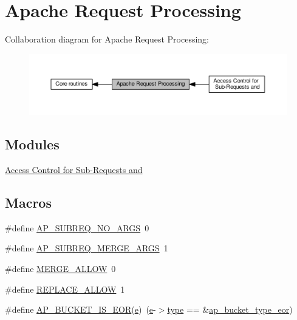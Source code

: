 \hypertarget{group__APACHE__CORE__REQ}{}\section{Apache Request Processing}
\label{group__APACHE__CORE__REQ}
Collaboration diagram for Apache Request Processing\+:
\nopagebreak
\begin{figure}[H]
\begin{center}
\leavevmode
\includegraphics[width=350pt]{group__APACHE__CORE__REQ}
\end{center}
\end{figure}
\subsection*{Modules}
\begin{DoxyCompactItemize}
\item 
\hyperlink{group__APACHE__CORE__REQ__AUTH}{Access Control for Sub-\/\+Requests and}
\end{DoxyCompactItemize}
\subsection*{Macros}
\begin{DoxyCompactItemize}
\item 
\#define \hyperlink{group__APACHE__CORE__REQ_gafc8d6d3833a22ffba0e9e336b99483eb}{A\+P\+\_\+\+S\+U\+B\+R\+E\+Q\+\_\+\+N\+O\+\_\+\+A\+R\+GS}~0
\item 
\#define \hyperlink{group__APACHE__CORE__REQ_ga3ddad04727c3c248d42a84cd5b765d16}{A\+P\+\_\+\+S\+U\+B\+R\+E\+Q\+\_\+\+M\+E\+R\+G\+E\+\_\+\+A\+R\+GS}~1
\item 
\#define \hyperlink{group__APACHE__CORE__REQ_gaa5d5871a4266e0548907af754b538aaf}{M\+E\+R\+G\+E\+\_\+\+A\+L\+L\+OW}~0
\item 
\#define \hyperlink{group__APACHE__CORE__REQ_ga9931376dd0f4fa2ebce0ece6bbe91aa5}{R\+E\+P\+L\+A\+C\+E\+\_\+\+A\+L\+L\+OW}~1
\item 
\#define \hyperlink{group__APACHE__CORE__REQ_ga8318214baeaec5af97903afeef38f253}{A\+P\+\_\+\+B\+U\+C\+K\+E\+T\+\_\+\+I\+S\+\_\+\+E\+OR}(\hyperlink{pcregrep_8txt_acd90314acb2c2e5cd19681136c08efac}{e})~(\hyperlink{pcregrep_8txt_acd90314acb2c2e5cd19681136c08efac}{e}-\/$>$\hyperlink{pcre_8txt_a2463fbbe8b0c90b90db12195e1edaa5d}{type} == \&\hyperlink{group__APACHE__CORE__REQ_ga6ad75664a7f2f7673accfabbe67a9fe5}{ap\+\_\+bucket\+\_\+type\+\_\+eor})
\end{DoxyCompactItemize}
